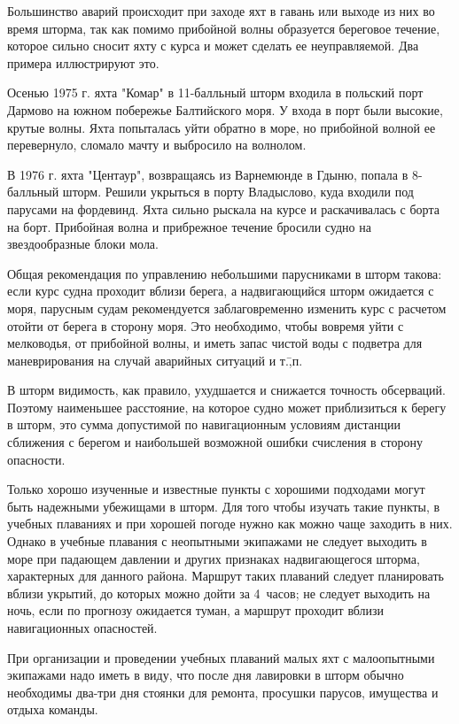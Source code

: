 Большинство аварий происходит при заходе яхт в гавань или выходе из них во время шторма, так как помимо прибойной волны образуется береговое течение, которое сильно сносит яхту с курса и может сделать ее неуправляемой. Два примера иллюстрируют это.

{\small Осенью 1975 г. яхта "Комар" в 11-балльный шторм входила в польский порт Дармово на южном побережье Балтийского моря. У входа в порт были высокие, крутые волны. Яхта попыталась уйти обратно в море, но прибойной волной ее перевернуло, сломало мачту и выбросило на волнолом.

В 1976 г. яхта "Центаур", возвращаясь из Варнемюнде в Гдыню, попала в 8-балльный шторм. Решили укрыться в порту Владыслово, куда входили под парусами на фордевинд. Яхта сильно рыскала на курсе и раскачивалась с борта на борт. Прибойная волна и прибрежное течение бросили судно на звездообразные блоки мола.}

Общая рекомендация по управлению небольшими парусниками в шторм такова: если курс судна проходит вблизи берега, а надвигающийся шторм ожидается с моря, парусным судам рекомендуется заблаговременно изменить курс с расчетом отойти от берега в сторону моря. Это необходимо, чтобы вовремя уйти с мелководья, от прибойной волны, и иметь запас чистой воды с подветра для маневрирования на случай аварийных ситуаций и т.\=,п. 

В шторм видимость, как правило, ухудшается и снижается точность обсерваций. Поэтому наименьшее расстояние, на которое судно может приблизиться к берегу в шторм, это сумма допустимой по навигационным условиям дистанции сближения с берегом и наибольшей возможной ошибки счисления в сторону опасности. 

Только хорошо изученные и известные пункты с хорошими подходами могут быть надежными убежищами в шторм. Для того чтобы изучать такие пункты, в учебных плаваниях и при хорошей погоде нужно как можно чаще заходить в них. Однако в учебные плавания с неопытными экипажами не следует выходить в море при падающем давлении и других признаках надвигающегося шторма, характерных для данного района. Маршрут таких плаваний следует планировать вблизи укрытий, до которых можно дойти за 4~часов; не следует выходить на ночь, если по прогнозу ожидается туман, а маршрут проходит вблизи навигационных опасностей. 

При организации и проведении учебных плаваний малых яхт с малоопытными экипажами надо иметь в виду, что после дня лавировки в шторм обычно необходимы два-три дня стоянки для ремонта, просушки парусов, имущества и отдыха команды. 

